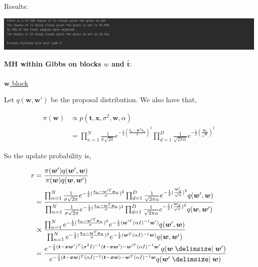 \documentclass[10pt]{homeworg}
\begin{document}
Results:
\begin{center}
\includegraphics[scale=0.7]{figures/q3_results.PNG}
\end{center}



\exercise 
\textbf{MH within Gibbs on blocks $w$ and $\hat{\boldsymbol t}$}:\\
\\
\underline{$\boldsymbol w$ block}

Let $q(\boldsymbol w,\boldsymbol w')$ be the proposal distribution. We also have that,

\begin{align*}
\pi(\boldsymbol w) &\propto p(\boldsymbol t,\boldsymbol x,\sigma^2,\boldsymbol w,\alpha)\\
	   &= \prod_{n=1}^N \frac{1}{\sigma \sqrt{2\pi}} e^{-\frac{1}{2}(\frac{\boldsymbol t_n-\boldsymbol w^T \boldsymbol x_n}{\sigma})^2} \prod_{d=1}^D \frac{1}{\sqrt{2\pi\alpha}} e^{-\frac{1}{2} (\frac{\boldsymbol w_d}{\sqrt{\alpha}})^2}
\end{align*}

So the update probability is,

\begin{align*}
r &= \frac{\pi(\boldsymbol w')q(\boldsymbol w',\boldsymbol w)}{\pi(\boldsymbol w)q(\boldsymbol w, \boldsymbol w')}\\
\vspace{0.5cm}
  &= \frac{\prod_{n=1}^N \frac{1}{\sigma \sqrt{2\pi}} e^{-\frac{1}{2}(\frac{\boldsymbol t_n-\boldsymbol w'^T\boldsymbol x_n}{\sigma})^2} \prod_{d=1}^D \frac{1}{\sqrt{2\pi\alpha}} e^{-\frac{1}{2} (\frac{\boldsymbol w'_d}{\sqrt{\alpha}})^2} q(\boldsymbol w',\boldsymbol w)}{\prod_{n=1}^N \frac{1}{\sigma \sqrt{2\pi}} e^{-\frac{1}{2}(\frac{\boldsymbol t_n-\boldsymbol w^T\boldsymbol x_n}{\sigma})^2} \prod_{d=1}^D \frac{1}{\sqrt{2\pi\alpha}} e^{-\frac{1}{2} (\frac{\boldsymbol w_d}{\sqrt{\alpha}})^2} q(\boldsymbol w, \boldsymbol w')}\\
  \vspace{0.5cm}
  &\propto  \frac{\prod_{n=1}^N e^{-\frac{1}{2}(\frac{\boldsymbol t_n-\boldsymbol w'^T\boldsymbol x_n}{\sigma})^2} e^{-\frac{1}{2}(\boldsymbol w'^T(\alpha I)^{-1}\boldsymbol w')} q(\boldsymbol w',\boldsymbol w)}{\prod_{n=1}^N e^{-\frac{1}{2}(\frac{\boldsymbol t_n-\boldsymbol w^T\boldsymbol x_n}{\sigma})^2} e^{-\frac{1}{2}(\boldsymbol w^T(\alpha I)^{-1}\boldsymbol w)} q(\boldsymbol w, \boldsymbol w')}\\
  &= \frac{e^{-\frac{1}{2}(\boldsymbol t - \boldsymbol x\boldsymbol w')^T(\sigma^2 I)^{-1}(\boldsymbol t-\boldsymbol x\boldsymbol w')-\boldsymbol w'^T(\alpha I)^{-1}\boldsymbol w'}q(\boldsymbol w \mid \boldsymbol w')}{e^{-\frac{1}{2}(\boldsymbol t - \boldsymbol x\boldsymbol w)^T(\alpha I)^{-1} (\boldsymbol t - \boldsymbol x\boldsymbol w)-\boldsymbol w^T(\alpha I)^{-1}\boldsymbol w}q(\boldsymbol w' \mid \boldsymbol w)}
\end{align*}
\end{document}
